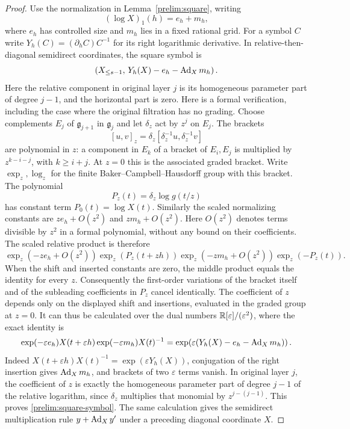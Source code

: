 \begin{proof}
Use the normalization in Lemma~\ref{prelim:square}, writing
\[
 (\log X)_1(h)=e_h+m_h,
\]
where $e_h$ has controlled size and $m_h$ lies in a fixed rational
grid.  For a symbol $C$ write
$Y_h(C)=(\partial_hC)C^{-1}$ for its right logarithmic derivative.
In relative-then-diagonal semidirect coordinates, the square symbol is
\begin{equation}\label{prelim:square-symbol}
 \left(X_{\leq s-1},\,
       Y_h(X)-e_h-\operatorname{Ad}_Xm_h\right).
\end{equation}
Here the relative component in original layer $j$ is its
homogeneous parameter part of degree $j-1$, and the horizontal
part is zero.  Here is a formal verification, including the case
where the original filtration has no grading.  Choose complements
$E_j$ of $\mathfrak g_{j+1}$ in $\mathfrak g_j$ and let
$\delta_z$ act by $z^j$ on $E_j$.  The brackets
\[
 [u,v]_z=\delta_z[\delta_z^{-1}u,\delta_z^{-1}v]
\]
are polynomial in $z$: a component in $E_k$ of a bracket of
$E_i,E_j$ is multiplied by $z^{k-i-j}$, with $k\geq i+j$.
At $z=0$ this is the associated graded bracket.  Write
$\exp_z,\log_z$ for the finite Baker--Campbell--Hausdorff group
with this bracket.  The polynomial
\[
 P_z(t)=\delta_z\log g(t/z)
\]
has constant term $P_0(t)=\log X(t)$.  Similarly the scaled
normalizing constants are $ze_h+O(z^2)$ and $zm_h+O(z^2)$.
Here $O(z^2)$ denotes terms divisible by $z^2$ in a formal
polynomial, without any bound on their coefficients.
The scaled relative product is therefore
\[
 \exp_z(-ze_h+O(z^2))\exp_z(P_z(t+zh))
 \exp_z(-zm_h+O(z^2))\exp_z(-P_z(t)).
\]
When the shift and inserted constants are zero, the middle
product equals the identity for every $z$.  Consequently the
first-order variations of the bracket itself and of the
subleading coefficients in $P_z$ cancel identically.  The
coefficient of $z$ depends only on the displayed shift and
insertions, evaluated in the graded group at $z=0$.
It can thus be calculated over the dual numbers
$\mathbb R[\varepsilon]/(\varepsilon^2)$, where the exact identity is
\[
 \exp(-\varepsilon e_h)X(t+\varepsilon h)
 \exp(-\varepsilon m_h)X(t)^{-1}
 =\exp\!\left(\varepsilon
       (Y_h(X)-e_h-\operatorname{Ad}_Xm_h)\right).
\]
Indeed $X(t+\varepsilon h)X(t)^{-1}=\exp(\varepsilon Y_h(X))$,
conjugation of the right insertion gives $\operatorname{Ad}_Xm_h$, and
brackets of two $\varepsilon$ terms vanish.  In original layer
$j$, the coefficient of $z$ is exactly the homogeneous
parameter part of degree $j-1$ of the relative logarithm, since
$\delta_z$ multiplies that monomial by $z^{j-(j-1)}$.
This proves
\eqref{prelim:square-symbol}.  The same calculation gives the
semidirect multiplication rule $y+\operatorname{Ad}_Xy'$ under a preceding
diagonal coordinate $X$.


\end{proof}
